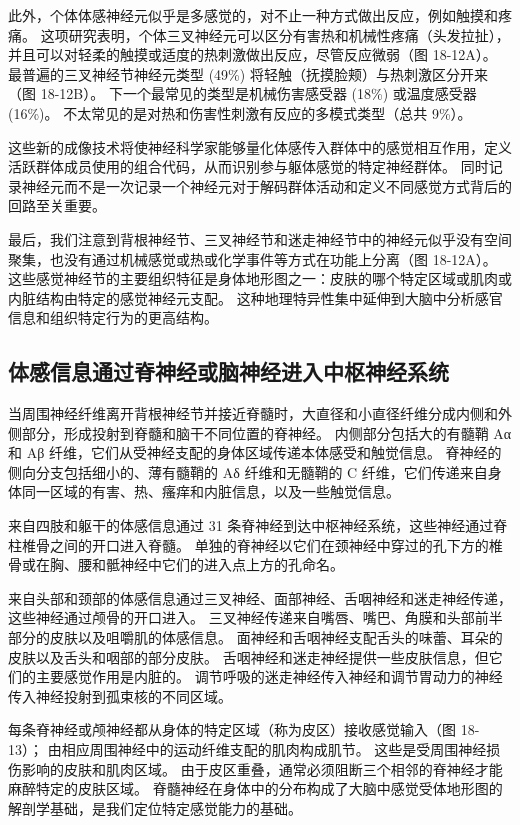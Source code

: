 此外，个体体感神经元似乎是多感觉的，对不止一种方式做出反应，例如触摸和疼痛。 这项研究表明，个体三叉神经元可以区分有害热和机械性疼痛（头发拉扯），并且可以对轻柔的触摸或适度的热刺激做出反应，尽管反应微弱（图 18-12A）。 最普遍的三叉神经节神经元类型 (49\%) 将轻触（抚摸脸颊）与热刺激区分开来（图 18-12B）。 下一个最常见的类型是机械伤害感受器 (18\%) 或温度感受器 (16\%)。 不太常见的是对热和伤害性刺激有反应的多模式类型（总共 9\%）。

这些新的成像技术将使神经科学家能够量化体感传入群体中的感觉相互作用，定义活跃群体成员使用的组合代码，从而识别参与躯体感觉的特定神经群体。 同时记录神经元而不是一次记录一个神经元对于解码群体活动和定义不同感觉方式背后的回路至关重要。

最后，我们注意到背根神经节、三叉神经节和迷走神经节中的神经元似乎没有空间聚集，也没有通过机械感觉或热或化学事件等方式在功能上分离（图 18-12A）。 这些感觉神经节的主要组织特征是身体地形图之一：皮肤的哪个特定区域或肌肉或内脏结构由特定的感觉神经元支配。 这种地理特异性集中延伸到大脑中分析感官信息和组织特定行为的更高结构。


\subsection{体感信息通过脊神经或脑神经进入中枢神经系统}
当周围神经纤维离开背根神经节并接近脊髓时，大直径和小直径纤维分成内侧和外侧部分，形成投射到脊髓和脑干不同位置的脊神经。 内侧部分包括大的有髓鞘 Aα 和 Aβ 纤维，它们从受神经支配的身体区域传递本体感受和触觉信息。 脊神经的侧向分支包括细小的、薄有髓鞘的 Aδ 纤维和无髓鞘的 C 纤维，它们传递来自身体同一区域的有害、热、瘙痒和内脏信息，以及一些触觉信息。

来自四肢和躯干的体感信息通过 31 条脊神经到达中枢神经系统，这些神经通过脊柱椎骨之间的开口进入脊髓。 单独的脊神经以它们在颈神经中穿过的孔下方的椎骨或在胸、腰和骶神经中它们的进入点上方的孔命名。

来自头部和颈部的体感信息通过三叉神经、面部神经、舌咽神经和迷走神经传递，这些神经通过颅骨的开口进入。 三叉神经传递来自嘴唇、嘴巴、角膜和头部前半部分的皮肤以及咀嚼肌的体感信息。 面神经和舌咽神经支配舌头的味蕾、耳朵的皮肤以及舌头和咽部的部分皮肤。 舌咽神经和迷走神经提供一些皮肤信息，但它们的主要感觉作用是内脏的。 调节呼吸的迷走神经传入神经和调节胃动力的神经传入神经投射到孤束核的不同区域。

每条脊神经或颅神经都从身体的特定区域（称为皮区）接收感觉输入（图 18-13）； 由相应周围神经中的运动纤维支配的肌肉构成肌节。 这些是受周围神经损伤影响的皮肤和肌肉区域。 由于皮区重叠，通常必须阻断三个相邻的脊神经才能麻醉特定的皮肤区域。 脊髓神经在身体中的分布构成了大脑中感觉受体地形图的解剖学基础，是我们定位特定感觉能力的基础。

